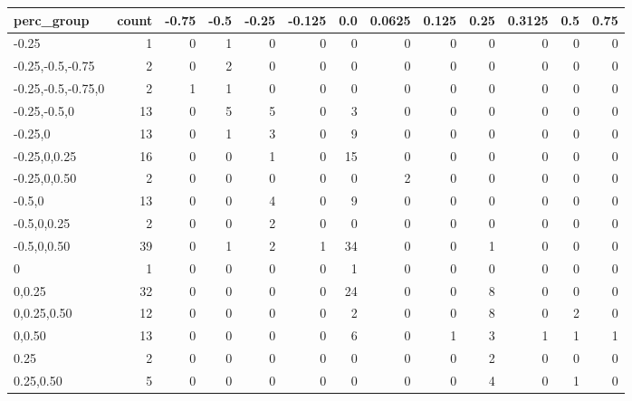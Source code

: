 \begin{tabular}{lrrrrrrrrrrrr}
\toprule
         perc\_group &  count &  -0.75 &  -0.5 &  -0.25 &  -0.125 &  0.0 &  0.0625 &  0.125 &  0.25 &  0.3125 &  0.5 &  0.75 \\
\midrule
              -0.25 &      1 &      0 &     1 &      0 &       0 &    0 &       0 &      0 &     0 &       0 &    0 &     0 \\
   -0.25,-0.5,-0.75 &      2 &      0 &     2 &      0 &       0 &    0 &       0 &      0 &     0 &       0 &    0 &     0 \\
 -0.25,-0.5,-0.75,0 &      2 &      1 &     1 &      0 &       0 &    0 &       0 &      0 &     0 &       0 &    0 &     0 \\
       -0.25,-0.5,0 &     13 &      0 &     5 &      5 &       0 &    3 &       0 &      0 &     0 &       0 &    0 &     0 \\
            -0.25,0 &     13 &      0 &     1 &      3 &       0 &    9 &       0 &      0 &     0 &       0 &    0 &     0 \\
       -0.25,0,0.25 &     16 &      0 &     0 &      1 &       0 &   15 &       0 &      0 &     0 &       0 &    0 &     0 \\
       -0.25,0,0.50 &      2 &      0 &     0 &      0 &       0 &    0 &       2 &      0 &     0 &       0 &    0 &     0 \\
             -0.5,0 &     13 &      0 &     0 &      4 &       0 &    9 &       0 &      0 &     0 &       0 &    0 &     0 \\
        -0.5,0,0.25 &      2 &      0 &     0 &      2 &       0 &    0 &       0 &      0 &     0 &       0 &    0 &     0 \\
        -0.5,0,0.50 &     39 &      0 &     1 &      2 &       1 &   34 &       0 &      0 &     1 &       0 &    0 &     0 \\
                  0 &      1 &      0 &     0 &      0 &       0 &    1 &       0 &      0 &     0 &       0 &    0 &     0 \\
             0,0.25 &     32 &      0 &     0 &      0 &       0 &   24 &       0 &      0 &     8 &       0 &    0 &     0 \\
        0,0.25,0.50 &     12 &      0 &     0 &      0 &       0 &    2 &       0 &      0 &     8 &       0 &    2 &     0 \\
             0,0.50 &     13 &      0 &     0 &      0 &       0 &    6 &       0 &      1 &     3 &       1 &    1 &     1 \\
               0.25 &      2 &      0 &     0 &      0 &       0 &    0 &       0 &      0 &     2 &       0 &    0 &     0 \\
          0.25,0.50 &      5 &      0 &     0 &      0 &       0 &    0 &       0 &      0 &     4 &       0 &    1 &     0 \\
\bottomrule
\end{tabular}
